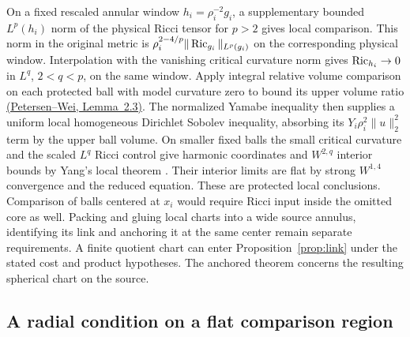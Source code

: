 On a fixed rescaled annular window \(h_i=\rho_i^{-2}g_i\), a
supplementary bounded \(L^p(h_i)\) norm of the physical Ricci
tensor for \(p>2\) gives local comparison. This norm in the
original metric is \(\rho_i^{2-4/p}\|\operatorname{Ric}_{g_i}\|_{L^p(g_i)}\)
on the corresponding physical window. Interpolation with
the vanishing critical curvature norm gives \(\operatorname{Ric}_{h_i}\to0\)
in \(L^q\), \(2<q<p\), on the same window. Apply integral
relative volume comparison on each protected ball with model
curvature zero to bound its upper volume ratio
\href{https://www.math.ucla.edu/~petersen/Papers/28.pdf}{(Petersen--Wei,
Lemma~2.3)}. The normalized Yamabe inequality then supplies
a uniform local homogeneous Dirichlet Sobolev inequality,
absorbing its \(Y_i\rho_i^2\|u\|_2^2\) term by the upper ball
volume. On smaller fixed balls the small critical curvature
and the scaled \(L^q\) Ricci control give harmonic coordinates
and \(W^{2,q}\) interior bounds by Yang's local theorem
\cite[Theorem 7.1]{Yang1992ConvergenceII}. Their interior limits
are flat by strong \(W^{1,4}\) convergence and the reduced equation.
These are protected local conclusions. Comparison of balls
centered at \(x_i\) would require Ricci input inside the omitted
core as well. Packing and gluing local charts into a wide
source annulus, identifying its link and anchoring it at the
same center remain separate requirements. A finite quotient
chart can enter Proposition~\ref{prop:link} under the stated
cost and product hypotheses. The anchored theorem concerns
the resulting spherical chart on the source.

\subsection{A radial condition on a flat comparison region}

